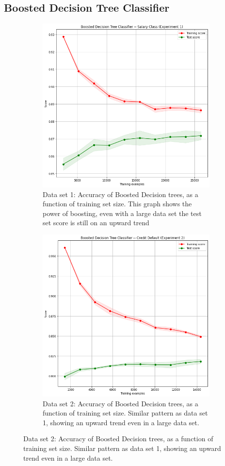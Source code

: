 \documentclass[
	letterpaper, %
]{IEEEtran}
\begin{document}
	\subsection{Boosted Decision Tree Classifier}
		\begin{figure}[h]
			\begin{subfigure}{.5\textwidth}
				\centering
				\includegraphics[width=.8\linewidth]{./images/bdtExp1.png}
				\caption{Data set 1: Accuracy of Boosted Decision trees, as a function of training set size. This graph shows the power of boosting, even with a large data set the test set score is still on an upward trend}
				\label{fig:bdtExp1}
			\end{subfigure}
			\begin{subfigure}{.5\textwidth}
				\centering
				\includegraphics[width=.8\linewidth]{./images/bdtExp2.png}
				\caption{Data set 2: Accuracy of Boosted Decision trees, as a function of training set size. Similar pattern as data set 1, showing an upward trend even in a large data set.}
				\label{fig:bdtExp2}
			\end{subfigure}
		\end{figure}
\end{document}
